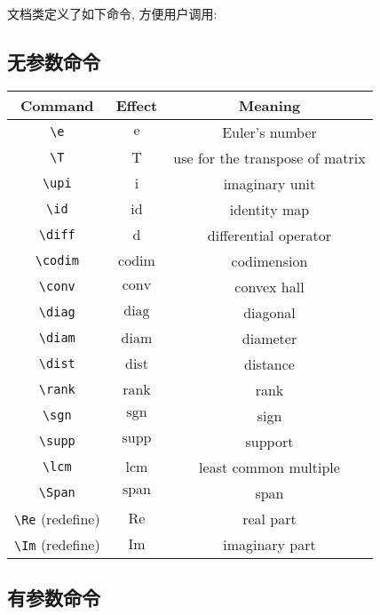 \documentclass{article}
\begin{document}
文档类定义了如下命令, 方便用户调用:

\subsection{无参数命令}

\begin{center}
  \begin{tabular}{ccc}
    \toprule
      Command & Effect & Meaning \\
    \midrule
      \verb|\e|  & $\mathrm{e}$ & Euler's number \\
      \verb|\T|  & $\mathrm{T}$ & use for the transpose of matrix \\
      \verb|\upi| & $\mathrm{i}$ & imaginary unit \\
      \verb|\id|  & $\mathrm{id}$ & identity map \\
      \verb|\diff| & $\mathrm{d}$ & differential operator \\
      \verb|\codim| & $\operatorname{codim}$ & codimension \\
      \verb|\conv| & $\operatorname{conv}$ & convex hall \\
      \verb|\diag| & $\operatorname{diag}$ & diagonal \\
      \verb|\diam| & $\operatorname{diam}$ & diameter \\
      \verb|\dist| & $\operatorname{dist}$ & distance \\
      \verb|\rank| & $\operatorname{rank}$ & rank \\
      \verb|\sgn|  & $\operatorname{sgn}$ & sign \\
      \verb|\supp| & $\operatorname{supp}$ & support \\
      \verb|\lcm| & $\operatorname{lcm}$ & least common multiple \\
      \verb|\Span| & $\operatorname{span}$ & span \\
      \verb|\Re| (redefine) & $\operatorname{Re}$ & real part \\
      \verb|\Im| (redefine) & $\operatorname{Im}$ & imaginary part \\
    \bottomrule
  \end{tabular}
\end{center}


\subsection{有参数命令}
\end{document}
